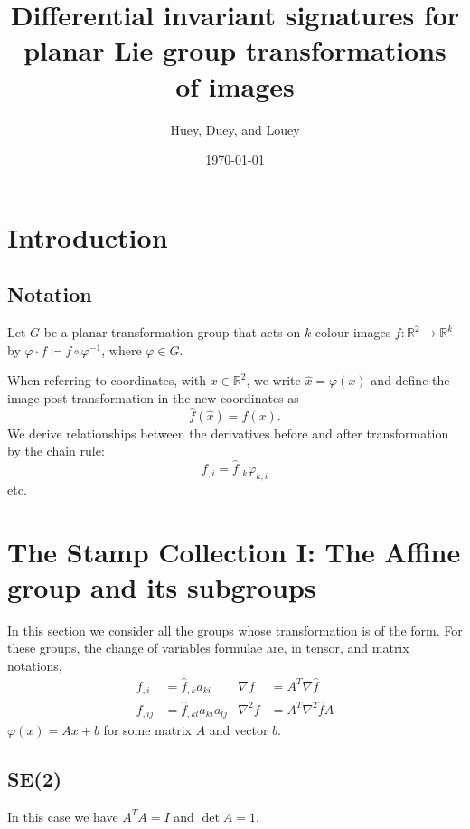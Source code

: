 \documentclass{article}
\title{Differential invariant signatures for planar Lie group transformations of
images}
\date{\today}
\author{Huey, Duey, and Louey}
\begin{document}
\maketitle




\section{Introduction}
\subsection{Notation}
Let $G$ be a planar transformation group that acts on $k$-colour images $f
\colon \mathbb{R}^2 \rightarrow \mathbb{R}^k$ by $\varphi \cdot f \coloneqq
f \circ \varphi^{-1}$, where $\varphi \in G$.

When referring to coordinates, with $x \in \mathbb{R}^2$, we write $\hat{x}
= \varphi(x)$  and define the image post-transformation in the new
coordinates as
\begin{equation}
  \hat{f}(\hat{x}) = f(x).
\end{equation}
We derive relationships between the derivatives before and after
transformation by the chain rule:
\begin{equation*}
  f_{, i} = \hat{f}_{,k} \varphi_{k, i} 
\end{equation*}
etc. 





\section{The Stamp Collection I: The Affine group and its subgroups}
In this section we consider all the groups whose transformation is of the
form. For these groups, the change of variables formulae are, in tensor,
and matrix notations,
\begin{align}
  f_{,i} &= \hat{f}_{, k} a_{ki} & \nabla f &= A^T \nabla \hat{f} \\
  f_{,ij} &= \hat{f}_{, kl} a_{ki} a_{lj} & 
  \nabla^2 f &= A^T \nabla^2 \hat{f} A
\end{align}
$\varphi(x) = Ax + b$ for some matrix $A$ and vector $b$.

\subsection{SE(2)}
In this case we have $A^TA = I$ and $\det A = 1$.
\end{document}
